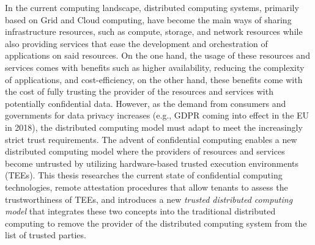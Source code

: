 \Abstract

In the current computing landscape, distributed computing systems, primarily
based on Grid and Cloud computing, have become the main ways of sharing
infrastructure resources, such as compute, storage, and network resources while
also providing services that ease the development and orchestration of
applications on said resources. On the one hand, the usage of these resources
and services comes with benefits such as higher availability, reducing the
complexity of applications, and cost-efficiency, on the other hand, these
benefits come with the cost of fully trusting the provider of the resources and
services with potentially confidential data. However, as the demand from
consumers and governments for data privacy increases (e.g., GDPR coming into
effect in the EU in 2018), the distributed computing model must adapt to meet
the increasingly strict trust requirements. The advent of confidential computing
enables a new distributed computing model where the providers of resources and
services become untrusted by utilizing hardware-based trusted execution
environments (TEEs). This thesis researches the current state of confidential
computing technologies, remote attestation procedures that allow tenants to
assess the trustworthiness of TEEs, and introduces a new \textit{trusted
distributed computing model} that integrates these two concepts into the
traditional distributed computing to remove the provider of the distributed
computing system from the list of trusted parties.
